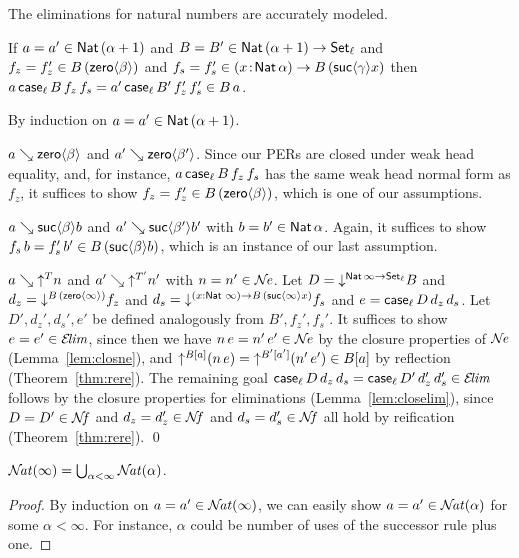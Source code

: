\documentclass[acmlarge,review,anonymous]{acmart}\settopmatter{printfolios=true}
\makeatletter
\newenvironment{proof*}[1][\proofname]{\par
  \normalfont \topsep6\p@\@plus6\p@\relax
  \trivlist
  \item[\@proofindent\hskip\labelsep
        {\@proofnamefont #1\@addpunct{.}}]\ignorespaces
}{%
  \endtrivlist\@endpefalse
}
\makeatother
\begin{document}
The eliminations for natural numbers are accurately modeled.
\begin{lemma}[Case]
  \label{lem:case}
If\/ $a = a' \in \Nat (\alpha+1)$
and $B = B' \in \Nat (\alpha+1) \to \Set[\ell]$
and $f_z = f_z' \in B\,(\zero \beta)$
and $f_s = f_s' \in \funT x {\Nat \alpha} B\,(\suc \gamma x)$
then $a\,\case[\ell] B {f_z}{f_s} = a'\,\case[\ell] {B'} {f_z'}{f_s'} \in B\,a$.
\end{lemma}
\begin{proof*}
By induction on $a = a' \in \Nat(\alpha+1)$.
\begin{caselist}

\nextcase $a \evalsto \zero \beta$ and $a' \evalsto \zero{\beta'}$.
Since our PERs are closed under weak head equality,
and, for instance, $a\, \case[\ell] B {f_z}{f_s}$ has the same weak head normal form as $f_z$,
it suffices to show $f_z = f_z' \in B\,(\zero \beta)$, which is one of our assumptions.

\nextcase $a \evalsto \suc \beta b$ and $a' \evalsto \suc {\beta'}{b'}$ with $b = b' \in \Nat \alpha$.
Again, it suffices to show
$f_s\,b = f_s'\,b' \in B\,(\suc \beta b)$, which is an instance of our last assumption.

\nextcase $a \evalsto \up T n$ and $a' \evalsto \up {T'} n'$ with $n = n' \in \NE$.
Let $D = \down{\Nat \infty \to \Set[\ell]} B$
and $d_z = \down{B\,(\zero \infty)} f_z$
and $d_s = \down{\funS x {\Nat\,\infty} {B\,(\suc \infty x)}} f_s$
and $e = \case[\ell] D {d_z}{d_s}$.
Let $D',d_z',d_s',e'$ be defined analogously from $B',f_z',f_s'$.  It suffices to show $e = e' \in \ELIM$, since then we have $n\,e = n'\,e' \in \NE$ by the closure properties of $\NE$ (Lemma~\ref{lem:closne}),
and $\up{B[a]} (n\,e) = \up{B'[a']} (n'\,e') \in B[a]$ by reflection (Theorem~\ref{thm:rere}).
The remaining goal $\case[\ell] D {d_z}{d_s} = \case[\ell] {D'} {d_z'}{d_s'} \in \ELIM$ follows by the closure properties for eliminations (Lemma~\ref{lem:closelim}), since $D = D' \in \NF$ and $d_z = d_z' \in \NF$ and $d_s = d_s' \in \NF$ all hold by reification (Theorem~\ref{thm:rere}).
\qed
\end{caselist}
\end{proof*}

\begin{lemma}
  \label{lem:limit}
  $\NAT(\infty) = \bigcup_{\alpha < \infty} \NAT(\alpha)$.
\end{lemma}
\begin{proof}
  By induction on $a = a' \in \NAT(\infty)$, we can easily show $a = a' \in \NAT(\alpha)$ for some $\alpha < \infty$.
  For instance, $\alpha$ could be number of uses of the successor rule plus one.
\end{proof}
\end{document}
